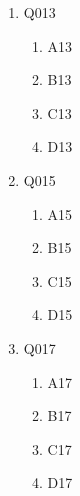 \documentclass[12pt]{article}
\begin{document}
\begin{enumerate}
    \item Q013
    \begin{enumerate}[label=(\Alph*)]
        
        \item A13
        
        \item B13
        
        \item C13
        
        \item D13
        
    \end{enumerate}

    \item Q015
    \begin{enumerate}[label=(\Alph*)]
        
        \item A15
        
        \item B15
        
        \item C15
        
        \item D15
        
    \end{enumerate}

    \item Q017
    \begin{enumerate}[label=(\Alph*)]
        
        \item A17
        
        \item B17
        
        \item C17
        
        \item D17
        
    \end{enumerate}

\end{enumerate}
\end{document}
